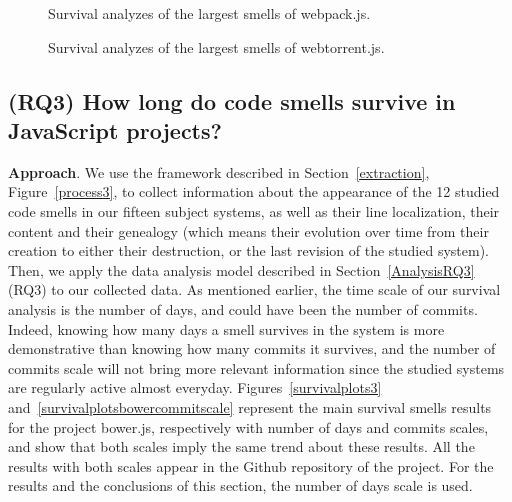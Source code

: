 \documentclass[smallcondensed]{svjour3}
\begin{document}
\clearpage

\begin{figure}[!htbp]
	\centering%
	\caption{Survival analyzes of the largest smells of webpack.js.\vspace{-10pt}}
	\label{survivalplots14}
\end{figure}

\begin{figure}[!htbp]
	\centering%
	\caption{Survival analyzes of the largest smells of webtorrent.js.\vspace{-10pt}}
	\label{survivalplots15}
\end{figure}

\subsection*{(RQ3) How long do code smells survive in JavaScript projects?}

\textbf{Approach}. We use the framework described in Section~\ref{extraction}, Figure~\ref{process3}, to collect information about the appearance of the 12 studied code smells in our fifteen subject systems, as well as their line localization, their content and their genealogy (which means their evolution over time from their creation to either their destruction, or the last revision of the studied system). Then, we apply the data analysis model described in Section~\ref{AnalysisRQ3} (RQ3) to our collected data. {\color{blue}As mentioned earlier, the time scale of our survival analysis is the number of days, and could have been the number of commits. Indeed, knowing how many days a smell survives in the system is more demonstrative than knowing how many commits it survives, and the number of commits scale will not bring more relevant information since the studied systems are regularly active almost everyday. Figures~\ref{survivalplots3} and~\ref{survivalplotsbowercommitscale} represent the main survival smells results for the project bower.js, respectively with number of days and commits scales, and show that both scales imply the same trend about these results. All the results with both scales appear in the Github repository of the project. For the results and the conclusions of this section, the number of days scale is used.}
\end{document}
